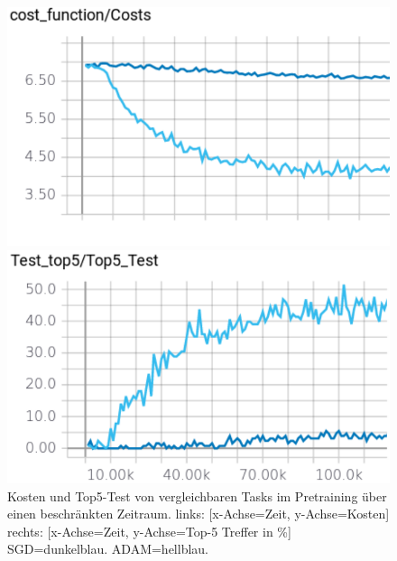 \begin{figure}
	\centering
	\begin{minipage}[b]{0.48\textwidth}	
		\includegraphics[width=\textwidth]{Kapitel/20Pretraining/Bilder/SGDvsADAMcost.pdf}
	\end{minipage}
	\hfill
	\begin{minipage}[b]{0.48\textwidth}		
		\includegraphics[width=\textwidth]{Kapitel/20Pretraining/Bilder/SGDvsADAMtop5.pdf}
	\end{minipage}
	\caption{Kosten und Top5-Test von vergleichbaren Tasks im Pretraining über einen beschränkten Zeitraum.
	links: [x-Achse=Zeit, y-Achse=Kosten]
	rechts: [x-Achse=Zeit, y-Achse=Top-5 Treffer in \%] 
	SGD=dunkelblau.
	ADAM=hellblau.}
	\label{img:SGDvsADAM}
\end{figure}
